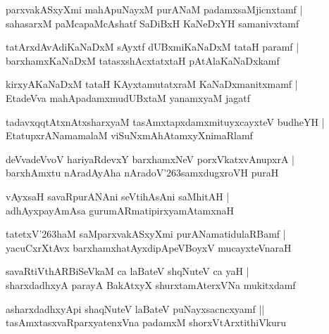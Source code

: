 \documentclass[twoside,12pt,openright]{book}
\newcounter{shloka}[chapter]
\begin{document}
\begin{shloka}
parxvakASxyXmi mahApuNayxM purANaM padamxsaMjicnxtamf |\\
sahasarxM paMcapaMcAshatf SaDiBxH KaNeDxYH samanivxtamf 
\end{shloka}

\begin{shloka}
tatArxdAvAdiKaNaDxM sAyxtf dUBxmiKaNaDxM tataH paramf |\\
barxhamxKaNaDxM tatasxshAcxtatxtaH pAtAlaKaNaDxkamf 
\end{shloka}

\begin{shloka}
kirxyAKaNaDxM tataH KAyxtamutatxraM KaNaDxmanitxmamf |\\
EtadeVva mahApadamxmudUBxtaM yanamxyaM jagatf 
\end{shloka}


\begin{shloka}
tadavxqqtAtxnAtxsharxyaM tasAmxtapxdamxmituyxcayxteV budheYH |\\
EtatupxrANamamalaM viSuNxmAhAtamxyXnimaRlamf
\end{shloka}

\begin{shloka}
deVvadeVvoV hariyaRdevxY barxhamxNeV porxVkatxvAnupxrA |\\
barxhAmxtu nAradAyAha nAradoV\char'263samxdugxroVH puraH 
\end{shloka}

\begin{shloka}
vAyxsaH savaRpurANAni seVtihAsAni saMhitAH |\\
adhAyxpayAmAsa gurumARmatipirxyamAtamxnaH 
\end{shloka}

\begin{shloka}
tatetxV\char'263haM saMparxvakASxyXmi purANamatidulaRBamf |\\
yacuCxrXtAvx barxhamxhatAyxdipApeVBoyxV mucayxteVnaraH 
\end{shloka}

\begin{shloka}
savaRtiVthARBiSeVkaM ca laBateV shqNuteV ca yaH |\\
sharxdadhxyA parayA BakAtxyX shurxtamAterxVNa mukitxdamf 
\end{shloka}

\begin{shloka}
asharxdadhxyApi shaqNuteV laBateV puNayxsacncxyamf ||\\
tasAmxtasxvaRparxyatenxVna padamxM shorxVtArxtithiVkuru
\end{shloka}
\end{document}
